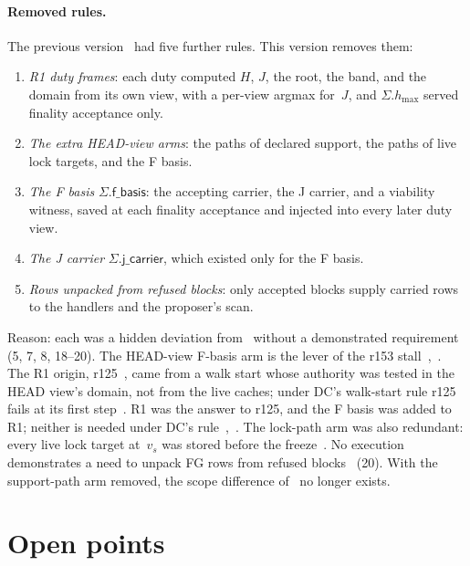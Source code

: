 \documentclass{article}
\theoremstyle{plain}
\theoremstyle{definition}
\theoremstyle{remark}
\newcommand{\hmax}{h_{\max}}
\newcommand{\LDP}[1]{\cite[\S#1]{LDP}}
\newcommand{\LV}[1]{\cite[\S#1]{LV}}
\begin{document}
\paragraph{Removed rules.}  The previous version~\cite{PREV} had five
further rules.  This version removes them:
\begin{enumerate}[nosep,leftmargin=*]
\item \emph{R1 duty frames}: each duty computed $H$, $J$, the root, the
  band, and the domain from its own view, with a per-view argmax
  for~$J$, and $\Sigma.\hmax$ served finality acceptance only.
\item \emph{The extra HEAD-view arms}: the paths of declared support,
  the paths of live lock targets, and the F basis.
\item \emph{The F basis} $\Sigma.\mathsf{f\_basis}$: the accepting
  carrier, the J carrier, and a viability witness, saved at each finality
  acceptance and injected into every later duty view.
\item \emph{The J carrier} $\Sigma.\mathsf{j\_carrier}$, which existed
  only for the F basis.
\item \emph{Rows unpacked from refused blocks}: only accepted blocks
  supply carried rows to the handlers and the proposer's scan.
\end{enumerate}
Reason: each was a hidden deviation from~\cite{DC} without a
demonstrated requirement~\LV{2} (5, 7, 8, 18--20).  The HEAD-view F-basis
arm is the lever of the r153 stall~\cite{REACH},~\LDP{5.1}.  The R1
origin, r125~\cite{PCS}, came from a walk start whose authority was
tested in the HEAD view's domain, not from the live caches;
under DC's walk-start rule r125 fails at its first step~\LDP{5.4}.  R1
was the answer to r125, and the F basis was added to R1; neither is
needed under DC's rule~\LDP{1},~\LDP{10}.  The lock-path arm was also
redundant: every live lock target at~$v_s$ was stored before the
freeze~\LDP{1}.  No execution demonstrates a need to unpack FG
rows from refused blocks~\LV{2} (20).  With the support-path arm removed, the scope
difference of~\cite[M3]{RT} no longer exists.

\section{Open points}\label{sec:open}
\end{document}
